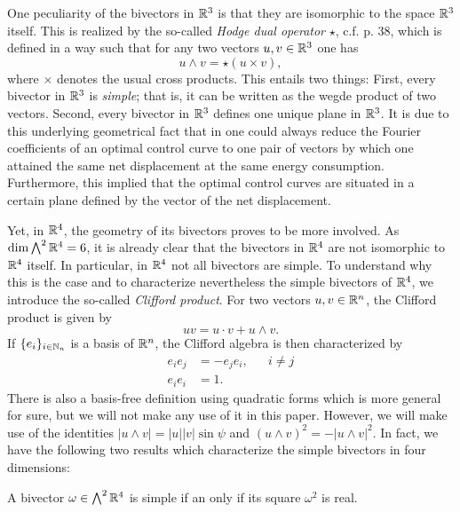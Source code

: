One peculiarity of the bivectors in $\mathbb{R}^3$ is that they are isomorphic to the space $\mathbb{R}^3$ itself. This is realized by the so-called \emph{Hodge dual operator} $\star$, c.f. \cite{Lounesto2006} p. 38, which is defined in a way such that for any two vectors $u,v \in \mathbb{R}^3$ one has
\begin{equation}
\label{eq: hodge star}
u \wedge v = \star(u \times v),
\end{equation}
where $\times$ denotes the usual cross products. This entails two things: First, every bivector in $\mathbb{R}^3$ is \emph{simple}; that is, it can be written as the wegde product of two vectors. Second, every bivector in $\mathbb{R}^3$ defines one unique plane in $\mathbb{R}^3$. It is due to this underlying geometrical fact that in \cite{Alouges2017} one could always reduce the Fourier coefficients of an optimal control curve to one pair of vectors by which one attained the same net displacement at the same energy consumption. Furthermore, this implied that the optimal control curves are situated in a certain plane defined by the vector of the net displacement.

Yet, in $\mathbb{R}^4$, the geometry of its bivectors proves to be more involved. As $\dim \bigwedge^2 \mathbb{R}^4 = 6$, it is already clear that the bivectors in $\mathbb{R}^4$ are not isomorphic to $\mathbb{R}^4$ itself. In particular, in $\mathbb{R}^4$ not all bivectors are simple. To understand why this is the case and to characterize nevertheless the simple bivectors of $\mathbb{R}^4$, we introduce the so-called \emph{Clifford product}. For two vectors $u, v \in \mathbb{R}^n$, the Clifford product is given by
\begin{equation}
uv = u \cdot v + u \wedge v.
\end{equation}
If $\{e_i\}_{i \in \mathbb{N}_n}$ is a basis of $\mathbb{R}^n$, the Clifford algebra is then characterized by 
\begin{equation}
\begin{aligned}
	e_i e_j &= - e_j e_i,& & i \neq j\\
	e_i e_i &= 1.
\end{aligned}
\end{equation}
There is also a basis-free definition using quadratic forms which is more general for sure, but we will not make any use of it in this paper. However, we will make use of the identities $|u \wedge v| = |u| |v| \sin \psi$ and $(u \wedge v)^2 = - |u \wedge v|^2$. In fact, we have the following two results which characterize the simple bivectors in four dimensions:

\begin{proposition}
\label{lem:cond simple 1}
A bivector $\omega \in \bigwedge^2 \mathbb{R}^4$ is simple if an only if its square $\omega^2$ is real.
\end{proposition}

